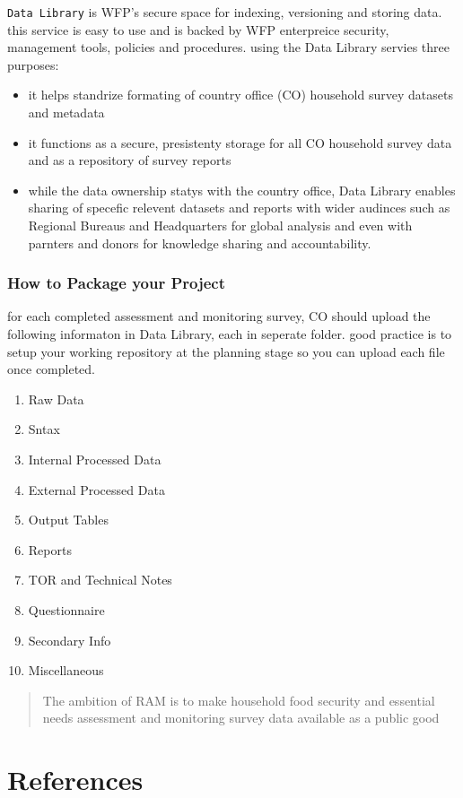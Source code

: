 \documentclass[
  letterpaper,
  DIV=11,
  numbers=noendperiod]{scrreprt}
\providecommand{\tightlist}{%
  \setlength{\itemsep}{0pt}\setlength{\parskip}{0pt}}\usepackage{longtable,booktabs,array}
\newlength{\cslhangindent}
\newlength{\cslentryspacingunit} %
\newenvironment{CSLReferences}[2] %
 {%
  \setlength{\parindent}{0pt}
  \ifodd #1
  \let\oldpar\par
  \def\par{\hangindent=\cslhangindent\oldpar}
  \fi
  \setlength{\parskip}{#2\cslentryspacingunit}
 }%
 {}
\begin{document}
\texttt{Data\ Library} is WFP's secure space for indexing, versioning
and storing data. this service is easy to use and is backed by WFP
enterpreice security, management tools, policies and procedures. using
the Data Library servies three purposes:

\begin{itemize}
\tightlist
\item
  it helps standrize formating of country office (CO) household survey
  datasets and metadata
\item
  it functions as a secure, presistenty storage for all CO household
  survey data and as a repository of survey reports
\item
  while the data ownership statys with the country office, Data Library
  enables sharing of specefic relevent datasets and reports with wider
  audinces such as Regional Bureaus and Headquarters for global analysis
  and even with parnters and donors for knowledge sharing and
  accountability.
\end{itemize}

\hypertarget{how-to-package-your-project}{%
\subsection{How to Package your
Project}\label{how-to-package-your-project}}

for each completed assessment and monitoring survey, CO should upload
the following informaton in Data Library, each in seperate folder. good
practice is to setup your working repository at the planning stage so
you can upload each file once completed.

\begin{enumerate}
\def\labelenumi{\arabic{enumi}.}
\tightlist
\item
  Raw Data
\item
  Sntax
\item
  Internal Processed Data
\item
  External Processed Data
\item
  Output Tables
\item
  Reports
\item
  TOR and Technical Notes
\item
  Questionnaire
\item
  Secondary Info
\item
  Miscellaneous
\end{enumerate}

\begin{quote}
The ambition of RAM is to make household food security and essential
needs assessment and monitoring survey data available as a public good
\end{quote}


\hypertarget{references}{%
\chapter*{References}\label{references}}


\hypertarget{refs}{}
\begin{CSLReferences}{0}{0}
\end{CSLReferences}
\end{document}
